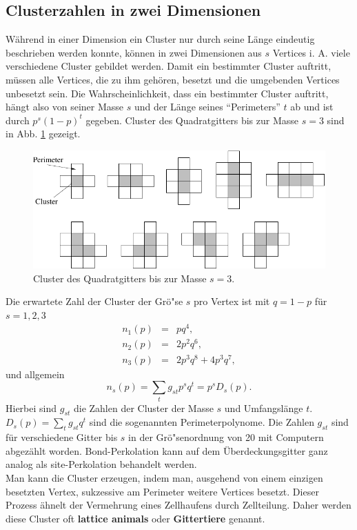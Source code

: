 \subsection{Clusterzahlen in zwei Dimensionen}
\label{sec:animals}
W\"ahrend in einer Dimension ein Cluster nur durch seine L\"ange eindeutig beschrieben werden konnte, k\"onnen in zwei Dimensionen aus $s$ Vertices i. A. viele verschiedene Cluster gebildet werden. Damit ein bestimmter Cluster auftritt, m\"ussen alle Vertices, die zu ihm geh\"oren, besetzt und die umgebenden Vertices unbesetzt sein. Die Wahrscheinlichkeit, dass ein bestimmter Cluster auftritt, h\"angt also von seiner Masse $s$ und der L\"ange seines ``Perimeters'' $t$ ab und ist durch $p^s(1-p)^t$ gegeben. Cluster des Quadratgitters bis zur Masse $s=3$ sind in Abb. \ref{fig:2d_cluster} gezeigt. 
\begin{figure}[tbp]
  \centering
  \includegraphics{./Einleitung-figs/2D_cluster}
  \caption{Cluster des Quadratgitters bis zur Masse $s=3$.}
  \label{fig:2d_cluster}
\end{figure}
Die erwartete Zahl der Cluster der Gr\"o"se $s$ pro Vertex ist mit $q=1-p$ f\"ur $s=1,2,3$
\begin{eqnarray}
n_1(p) & = & pq^4, \\
n_2(p) & = & 2p^2q^6, \\
n_3(p) & = & 2p^3q^8+4p^3q^7,
\end{eqnarray}
und allgemein
\begin{equation}
n_s(p)=\sum_t g_{st}p^sq^t=p^sD_s(p).
\end{equation}
Hierbei sind $g_{st}$ die Zahlen der Cluster der Masse $s$ und Umfangsl\"ange $t$. $D_s(p)=\sum_t g_{st}q^t$ sind die sogenannten Perimeterpolynome. Die Zahlen $g_{st}$ sind f\"ur verschiedene Gitter bis $s$ in der Gr\"o"senordnung von 20 mit Computern abgez\"ahlt worden. Bond-Perkolation kann auf dem \"Uberdeckungsgitter ganz analog als site-Perkolation behandelt werden.\\
Man kann die Cluster erzeugen, indem man, ausgehend von einem einzigen besetzten Vertex, sukzessive am Perimeter weitere Vertices besetzt. Dieser Prozess \"ahnelt der Vermehrung eines Zellhaufens durch Zellteilung. Daher werden diese Cluster oft \textbf{lattice animals} oder \textbf{Gittertiere} genannt.\\
